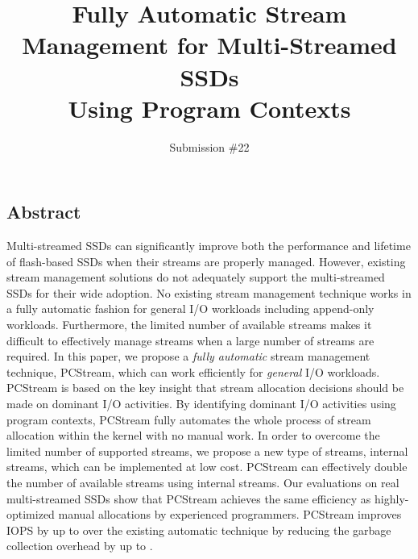 \documentclass[letterpaper, twocolumn, 10pt]{article}
\newcommand{\error}[1]{{\color{red}{#1}}}
\begin{document}
\title{
\bf Fully Automatic Stream Management for Multi-Streamed SSDs \\ Using Program Contexts}


\author{
{\rm Submission \#22} \\
}



%


\maketitle
\subsection*{Abstract}
\vspace{-6pt}
Multi-streamed SSDs can significantly improve both the performance and lifetime
of flash-based SSDs when their streams are properly managed.  However, existing
stream management solutions do not adequately support the multi-streamed SSDs
for their wide adoption.  No existing stream management technique works in a
fully automatic fashion for general I/O workloads including append-only
workloads.  Furthermore, the limited number of available streams makes it
difficult to effectively manage streams when a large number of streams are
required.  In this paper, we propose a {\it fully automatic} stream management
technique, \textsf{\small PCStream}, which can work efficiently for {\it
general} I/O workloads.  \textsf{\small PCStream} is based on the key insight
that stream allocation decisions should be made on dominant I/O activities. By
identifying dominant I/O activities using program contexts, \textsf{\small
PCStream} fully automates the whole process of stream allocation within the
kernel with no manual work.  In order to overcome the limited number of
supported streams, we propose a new type of streams, internal streams, which
can be implemented at low cost.  \textsf{\small PCStream} can effectively
double the number of available streams using internal streams.  Our evaluations
on real multi-streamed SSDs show that \textsf{\small PCStream} achieves the
same efficiency as highly-optimized manual allocations by experienced
programmers.  \textsf{\small PCStream} improves IOPS by up to \error{56\%} over the
existing automatic technique by reducing the garbage collection overhead by up
to \error{69\%}.
\end{document}
